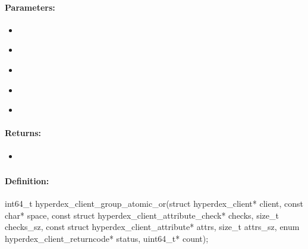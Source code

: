 \paragraph{Parameters:}
\begin{itemize}[noitemsep]
\item {}\\

\item {}\\

\item {}\\

\item {}\\

\item {}\\

\end{itemize}

\paragraph{Returns:}
\begin{itemize}[noitemsep]
\item {}\\

\end{itemize}

\pagebreak
\subsubsection{}
\label{api:c:group_atomic_or}


\paragraph{Definition:}
\begin{ccode}
int64_t hyperdex_client_group_atomic_or(struct hyperdex_client* client,
        const char* space,
        const struct hyperdex_client_attribute_check* checks, size_t checks_sz,
        const struct hyperdex_client_attribute* attrs, size_t attrs_sz,
        enum hyperdex_client_returncode* status,
        uint64_t* count);
\end{ccode}

